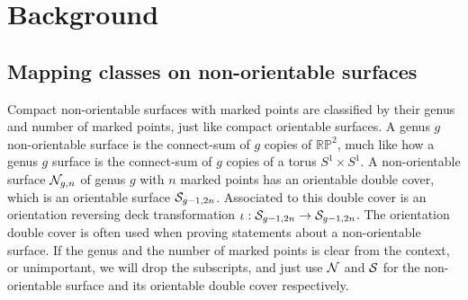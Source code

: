 \section{Background}
\label{sec:background}

\subsection{Mapping classes on non-orientable surfaces}
\label{sec:mapping-classes-non}

Compact non-orientable surfaces with marked points are classified by their genus and number of
marked points, just like compact orientable surfaces. A genus $g$ non-orientable surface is the
connect-sum of $g$ copies of $\mathbb{RP}^2$, much like how a genus $g$ surface is the connect-sum
of $g$ copies of a torus $S^1 \times S^1$. A non-orientable surface $\mathcal{N}_{g,n}$ of genus $g$ with
$n$ marked points has an orientable double cover, which is an orientable surface $\mathcal{S}_{g-1,
  2n}$. Associated to this double cover is an orientation reversing deck transformation
$\iota: \mathcal{S}_{g-1, 2n} \to \mathcal{S}_{g-1, 2n}$. The orientation double cover is often used when proving
statements about a non-orientable surface. If the genus and the number of marked points is clear
from the context, or unimportant, we will drop the subscripts, and just use $\mathcal{N}$ and $\mathcal{S}$ for the
non-orientable surface and its orientable double cover respectively.

